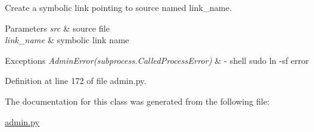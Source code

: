 Create a symbolic link pointing to source named {\ttfamily link\-\_\-name}. 


\begin{DoxyParams}{Parameters}
{\em src} & source file \\
\hline
{\em link\-\_\-name} & symbolic link name \\
\hline
\end{DoxyParams}

\begin{DoxyExceptions}{Exceptions}
{\em Admin\-Error(subprocess.\-Called\-Process\-Error)} & -\/ shell {\ttfamily sudo ln -\/sf} error \\
\hline
\end{DoxyExceptions}


Definition at line 172 of file admin.\-py.



The documentation for this class was generated from the following file\-:\begin{DoxyCompactItemize}
\item 
\hyperlink{admin_8py}{admin.\-py}\end{DoxyCompactItemize}
